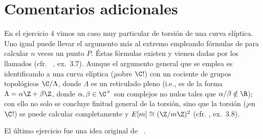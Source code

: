 \documentclass[11pt, reqno]{amsart}
\begin{document}
\section{Comentarios adicionales}
En el ejercicio 4 vimos un caso muy particular de torsión de una curva elíptica.
Uno igual puede llevar el argumento más al extremo empleando fórmulas de para calcular $n$ veces un punto $P$.
Éstas fórmulas existen y vienen dadas por los llamados 
(cfr. \citeauthor{silverman:elliptic}~\cite[105-106]{silverman:elliptic}, ex.~3.7).
Aunque el argumento general que se emplea es identificando a una curva elíptica (¡sobre $\C$!) con un cociente de grupos topológicos $\C/\Lambda$,
donde $\Lambda$ es un reticulado pleno (i.e., es de la forma $\Lambda = \alpha\Z + \beta\Z$, donde $\alpha, \beta \in \C^\times$ son complejos no nulos
tales que $\alpha/\beta \notin \R$); con ello no solo se concluye finitud general de la torsión, sino que la torsión (¡en $\C$!) se puede calcular
completamente y $E[m] \cong (\Z/m\Z)^2$ (cfr. \cite[106]{silverman:elliptic}, ex.~3.8).

El último ejercicio fue una idea original de \citeauthor{granville2018dynamical}~\cite{granville2018dynamical}.

\nocite{silverman:dynamical}
\printbibliography[title={Referencias y lecturas adicionales}]
\end{document}
